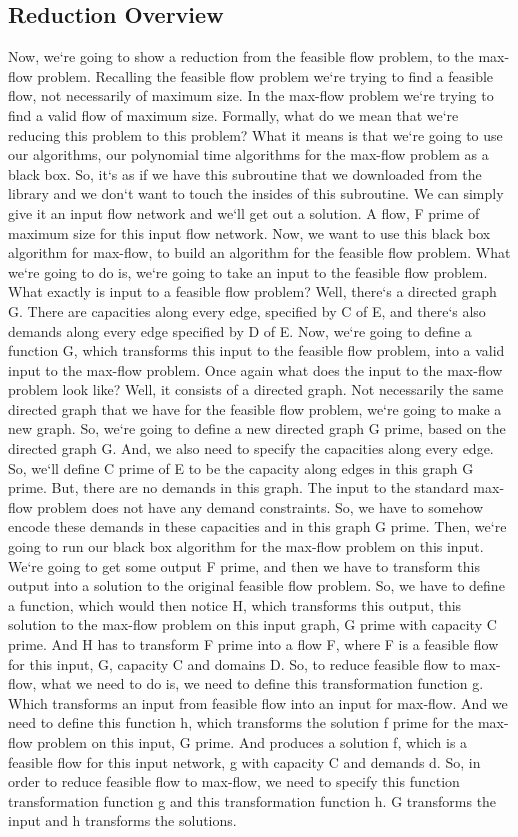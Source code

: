 \subsection{Reduction Overview}
Now, we`re going to show a reduction from the feasible flow problem, to the max-flow problem.
Recalling the feasible flow problem we`re trying to find a feasible flow, not necessarily of maximum size.
In the max-flow problem we`re trying to find a valid flow of maximum size.
Formally, what do we mean that we`re reducing this problem to this problem? What it means is that we`re going to use our algorithms, our polynomial time algorithms for the max-flow problem as a black box.
So, it`s as if we have this subroutine that we downloaded from the library and we don`t want to touch the insides of this subroutine.
We can simply give it an input flow network and we`ll get out a solution.
A flow, F prime of maximum size for this input flow network.
Now, we want to use this black box algorithm for max-flow, to build an algorithm for the feasible flow problem.
What we`re going to do is, we`re going to take an input to the feasible flow problem.
What exactly is input to a feasible flow problem? Well, there`s a directed graph G\@.
There are capacities along every edge, specified by C of E, and there`s also demands along every edge specified by D of E\@.
Now, we`re going to define a function G, which transforms this input to the feasible flow problem, into a valid input to the max-flow problem.
Once again what does the input to the max-flow problem look like? Well, it consists of a directed graph.
Not necessarily the same directed graph that we have for the feasible flow problem, we`re going to make a new graph.
So, we`re going to define a new directed graph G prime, based on the directed graph G\@.
And, we also need to specify the capacities along every edge.
So, we`ll define C prime of E to be the capacity along edges in this graph G prime.
But, there are no demands in this graph.
The input to the standard max-flow problem does not have any demand constraints.
So, we have to somehow encode these demands in these capacities and in this graph G prime.
Then, we`re going to run our black box algorithm for the max-flow problem on this input.
We`re going to get some output F prime, and then we have to transform this output into a solution to the original feasible flow problem.
So, we have to define a function, which would then notice H, which transforms this output, this solution to the max-flow problem on this input graph, G prime with capacity C prime.
And H has to transform F prime into a flow F, where F is a feasible flow for this input, G, capacity C and domains D\@.
So, to reduce feasible flow to max-flow, what we need to do is, we need to define this transformation function g.
Which transforms an input from feasible flow into an input for max-flow.
And we need to define this function h, which transforms the solution f prime for the max-flow problem on this input, G prime.
And produces a solution f, which is a feasible flow for this input network, g with capacity C and demands d.
So, in order to reduce feasible flow to max-flow, we need to specify this function transformation function g and this transformation function h.
G transforms the input and h transforms the solutions.

